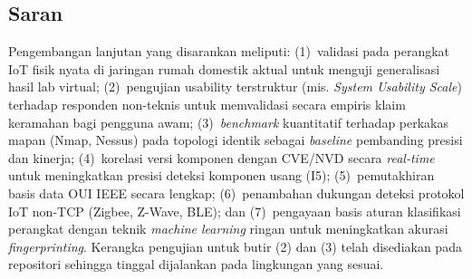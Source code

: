 \documentclass[conference]{IEEEtran}
\begin{document}
\subsection{Saran}

Pengembangan lanjutan yang disarankan meliputi:
(1)~validasi pada perangkat IoT fisik nyata di jaringan rumah domestik
aktual untuk menguji generalisasi hasil lab virtual;
(2)~pengujian usability terstruktur (mis. \textit{System Usability Scale})
terhadap responden non-teknis untuk memvalidasi secara empiris klaim
keramahan bagi pengguna awam;
(3)~\textit{benchmark} kuantitatif terhadap perkakas mapan (Nmap, Nessus)
pada topologi identik sebagai \textit{baseline} pembanding presisi dan
kinerja;
(4)~korelasi versi komponen dengan CVE/NVD secara \textit{real-time}
untuk meningkatkan presisi deteksi komponen usang (I5);
(5)~pemutakhiran basis data OUI IEEE secara lengkap;
(6)~penambahan dukungan deteksi protokol IoT non-TCP (Zigbee, Z-Wave,
BLE); dan
(7)~pengayaan basis aturan klasifikasi perangkat dengan teknik
\textit{machine learning} ringan untuk meningkatkan akurasi
\textit{fingerprinting}. Kerangka pengujian untuk butir (2) dan (3) telah
disediakan pada repositori sehingga tinggal dijalankan pada lingkungan
yang sesuai.
\end{document}
